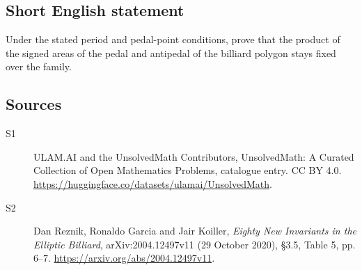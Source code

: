 \documentclass[11pt]{article}
\begin{document}
\subsection{Short English statement}
Under the stated period and pedal-point conditions, prove that the product of the signed areas of the pedal and antipedal of the billiard polygon stays fixed over the family.
\subsection{Sources}
\begin{description}
\item[\hypertarget{source:statement:1}{S1}] ULAM.AI and the UnsolvedMath Contributors, UnsolvedMath: A Curated Collection of Open Mathematics Problems, catalogue entry. CC BY 4.0. \url{https://huggingface.co/datasets/ulamai/UnsolvedMath}.
\item[\hypertarget{source:statement:2}{S2}] Dan Reznik, Ronaldo Garcia and Jair Koiller, \emph{Eighty New Invariants in the Elliptic Billiard}, arXiv:2004.12497v11 (29 October 2020), \S3.5, Table 5, pp. 6--7. \url{https://arxiv.org/abs/2004.12497v11}.
\end{description}
\label{end:statement}
\end{document}
